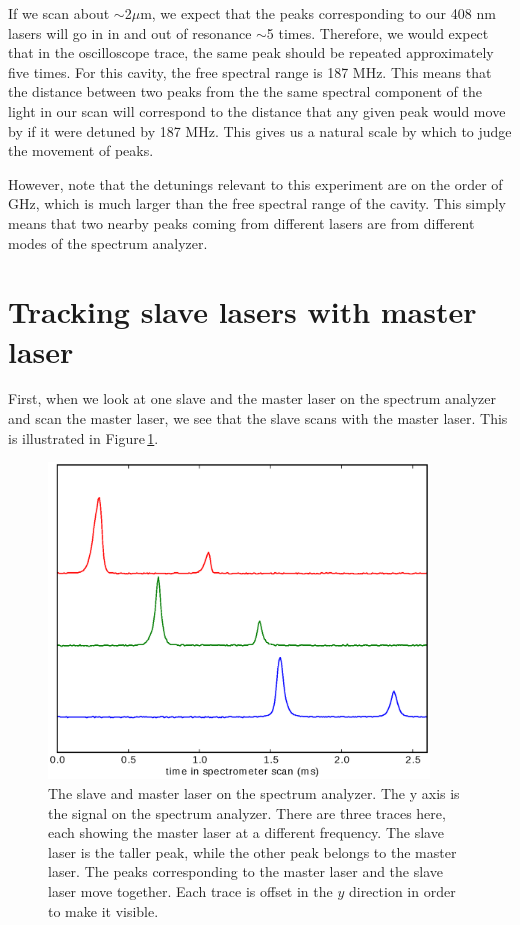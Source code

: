 If we scan about $\sim$2$\mu$m, we expect that the peaks corresponding to our 408 nm lasers will go in in and out of resonance $\sim$5 times. Therefore, we would expect that in the oscilloscope trace, the same peak should be repeated approximately five times. For this cavity, the free spectral range is 187 MHz. This means that the distance between two peaks from the the same spectral component of the light in our scan will correspond to the distance that any given peak would move by if it were detuned by 187 MHz. This gives us a natural scale by which to judge the movement of peaks. 

However, note that the detunings relevant to this experiment are on the order of GHz, which is much larger than the free spectral range of the cavity. This simply means that two nearby peaks coming from different lasers are from different modes of the spectrum analyzer. 


\section{Tracking slave lasers with master laser}

First, when we look at one slave and the master laser on the spectrum analyzer and scan the master laser, we see that the slave scans with the master laser. This is illustrated in Figure\,\ref{fig:slaveMaster}.

\begin{figure}
    \centerline{\includegraphics[width=0.9\textwidth]{Slave2AndMasterScanningMaster}}
    \caption[Slave laser and master laser frequencies tracking together]{\label{fig:slaveMaster}
    The slave and master laser on the spectrum analyzer. The y axis is the signal on the spectrum analyzer. There are three traces here, each showing the master laser at a different frequency. The slave laser is the taller peak, while the other peak belongs to the master laser. The peaks corresponding to the master laser and the slave laser move together. Each trace is offset in the $y$ direction in order to make it visible.}
\end{figure}

